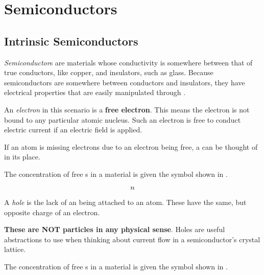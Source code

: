 \section{Semiconductors}\label{sec:Semiconductors}
\subsection{Intrinsic Semiconductors}\label{subsec:Intrinsic_Semiconductors}
\begin{definition}[Semiconductor]\label{def:Semiconductor}
  \emph{Semiconductor}s are materials whose conductivity is somewhere between that of true conductors, like copper, and insulators, such as glass.
  Because semiconductors are somewhere between conductors and insulators, they have electrical properties that are easily manipulated through .
\end{definition}

\begin{definition}[Electron]\label{def:Electron}
  An \emph{electron} in this scenario is a \textbf{free electron}.
  This means the electron is not bound to any particular atomic nucleus.
  Such an electron is free to conduct electric current if an electric field is applied.

  If an atom is missing electrons due to an electron being free, a  can be thought of in its place.
\end{definition}

The concentration of free s in a material is given the symbol shown in .

\begin{equation}\label{eq:Concentration_Free_Electrons}
  n
\end{equation}

\begin{definition}[Hole]\label{def:Hole}
  A \emph{hole} is the lack of an  being attached to an atom.
  These have the same, but opposite charge of an electron.

  \textbf{These are NOT particles in any physical sense}.
  Holes are useful abstractions to use when thinking about current flow in a semiconductor's crystal lattice.
\end{definition}

The concentration of free s in a material is given the symbol shown in .


